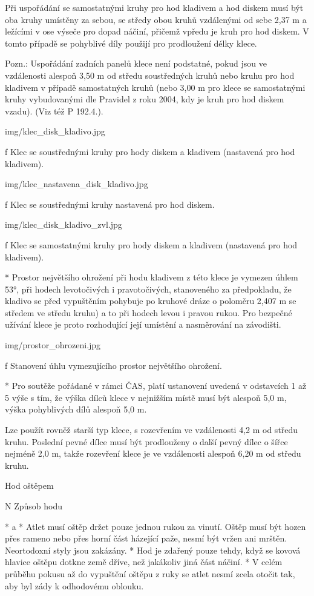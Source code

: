 Při uspořádání se samostatnými kruhy pro hod kladivem a hod diskem musí být oba kruhy umístěny za sebou, se středy obou kruhů vzdálenými od sebe 2,37 m a ležícími v ose výseče pro dopad náčiní, přičemž vpředu je kruh pro hod diskem. V tomto případě se pohyblivé díly použijí pro prodloužení délky klece.

Pozn.: Uspořádání zadních panelů klece není podstatné, pokud jsou ve vzdálenosti alespoň 3,50 m od středu soustředných kruhů nebo kruhu pro hod kladivem v případě samostatných kruhů (nebo 3,00 m pro klece se samostatnými kruhy vybudovanými dle Pravidel z roku 2004, kdy je kruh pro hod diskem vzadu).  (Viz též P 192.4.).

\picw=8cm \inspic img/klec_disk_kladivo.jpg
\caption/f Klec se soustřednými kruhy pro hody diskem a kladivem (nastavená pro hod kladivem).

\picw=7cm \inspic img/klec_nastavena_disk_kladivo.jpg
\caption/f Klec se soustřednými kruhy nastavená pro hod diskem.

\picw=7cm \inspic img/klec_disk_kladivo_zvl.jpg
\caption/f Klec se samostatnými kruhy pro hody diskem a kladivem (nastavená pro hod kladivem).

* Prostor největšího ohrožení při hodu kladivem z této klece je vymezen úhlem 53°, při hodech levotočivých i pravotočivých, stanoveného za předpokladu, že kladivo se před vypuštěním pohybuje po kruhové dráze o poloměru 2,407 m se středem ve středu kruhu) a to při hodech levou i pravou rukou. Pro bezpečné užívání klece je proto rozhodující její umístění a nasměrování na závodišti.

\picw=6cm \inspic img/prostor_ohrozeni.jpg
\caption/f Stanovení úhlu vymezujícího prostor největšího ohrožení.

* Pro soutěže pořádané v rámci ČAS, platí ustanovení uvedená v odstavcích 1 až 5 výše s tím, že výška dílců klece v nejnižším místě musí být alespoň 5,0 m, výška pohyblivých dílů alespoň 5,0 m.

Lze použít rovněž starší typ klece, s rozevřením ve vzdálenosti 4,2 m od středu kruhu. Poslední pevné dílce musí být prodlouženy o další pevný dílec o šířce nejméně 2,0 m, takže rozevření klece je ve vzdálenosti alespoň 6,20 m od středu kruhu.
\enditems

\secc Hod oštěpem

\begitems \style N
Způsob hodu

* \begitems \style a
  * Atlet musí oštěp držet pouze jednou rukou za vinutí. Oštěp musí být hozen přes rameno nebo přes horní část házející paže, nesmí být vržen ani mrštěn. Neortodoxní styly jsou zakázány.
  * Hod je zdařený pouze tehdy, když se kovová hlavice oštěpu dotkne země dříve, než jakákoliv jiná část náčiní.
  * V celém průběhu pokusu až do vypuštění oštěpu z ruky se atlet nesmí zcela otočit tak, aby byl zády k odhodovému oblouku.
  \enditems


